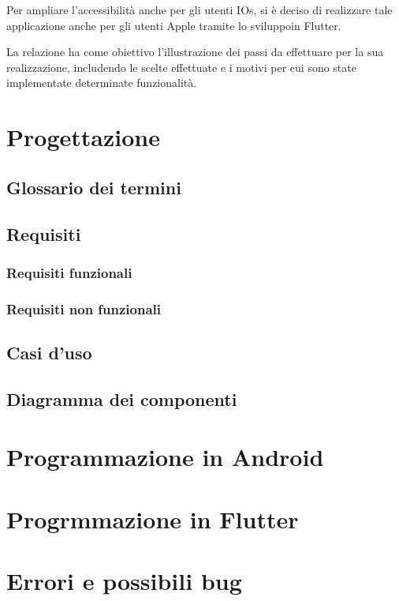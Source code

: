 \documentclass{article}
\begin{document}
Per ampliare l'accessibilità anche per gli utenti IOs, si è deciso di realizzare tale applicazione anche per gli utenti Apple tramite lo sviluppoin Flutter.

La relazione ha come obiettivo l'illustrazione dei passi da effettuare per la sua realizzazione, includendo le scelte effettuate e i motivi per cui sono state implementate determinate funzionalità.

\section{Progettazione}

\subsection{Glossario dei termini}
\subsection{Requisiti}
\subsubsection{Requisiti funzionali}
\subsubsection{Requisiti non funzionali}

\subsection{Casi d'uso}

\subsection{Diagramma dei componenti}



\section{Programmazione in Android}

\section{Progrmmazione in Flutter}

\section{Errori e possibili bug}
\end{document}
